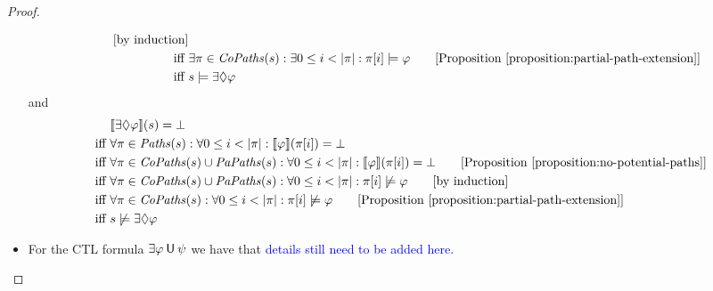 \documentclass[12pt]{article}
\newcommand{\eventually}{\Diamond}
\newcommand{\until}{\mathbin{\sf U}}
\theoremstyle{definition}
\newcommand{\comment}[1]{\hspace{2em}[\mbox{#1}]}
\newcommand{\satisfaction}[1]{\llbracket #1 \rrbracket}
\newcommand{\bottom}{\mathord{\perp}}
\begin{document}
\begin{proof}
\begin{itemize}
\begin{align*}
\comment{by induction}\\
\mbox{iff } & \exists \pi \in \mathit{CoPaths}(s) : \exists 0 \leq i < |\pi| : \pi[i] \models \varphi
\comment{Proposition~\ref{proposition:partial-path-extension}}\\
\mbox{iff } & s \models \exists \eventually \varphi
\end{align*}
and
\begin{align*}
& \satisfaction{\exists \eventually \varphi}(s) = \bottom\\
\mbox{iff } & \forall \pi \in \mathit{Paths}(s)  : \forall 0 \leq i < |\pi| : \satisfaction{\varphi}(\pi[i]) = \bottom\\
\mbox{iff } & \forall \pi \in \mathit{CoPaths}(s) \cup \mathit{PaPaths}(s) : \forall 0 \leq i < |\pi| : \satisfaction{\varphi}(\pi[i]) = \bottom
\comment{Proposition~\ref{proposition:no-potential-paths}}\\
\mbox{iff } & \forall \pi \in \mathit{CoPaths}(s) \cup \mathit{PaPaths}(s) : \forall 0 \leq i < |\pi| : \pi[i] \not\models \varphi \comment{by induction}\\
\mbox{iff } & \forall \pi \in \mathit{CoPaths}(s) : \forall 0 \leq i < |\pi| : \pi[i] \not\models \varphi \comment{Proposition~\ref{proposition:partial-path-extension}}\\
\mbox{iff } & s \not\models \exists \eventually \varphi
\end{align*}
\item
For the CTL formula $\exists \varphi \until \psi$ we have that
\textcolor{blue}{details still need to be added here.}
\end{itemize}
\end{proof}

\section{}
\end{document}
